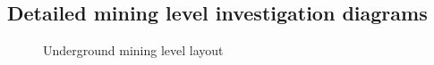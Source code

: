 \begin{appendices}
\chapter{Detailed mining level investigation diagrams}
\clearpage
\begin{figure}[h!]
	\centering
	\caption{Underground mining level layout}
	\label{fig: KUS Underground level layout}
\end{figure}
\end{appendices}
